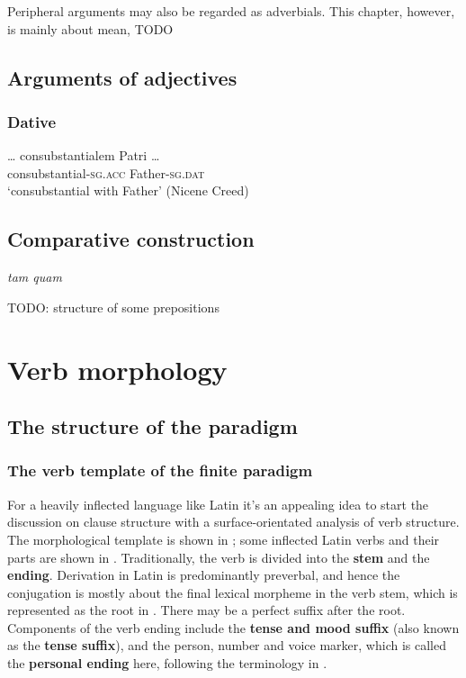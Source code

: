 \documentclass[a4paper, oneside, 12pt]{report}
\newcommand*{\citesec}[1]{\S~{#1}}
\newcommand*{\concept}[1]{\textbf{#1}}
\newcommand{\form}[1]{\emph{#1}}
\newcommand*{\category}[1]{\textsc{#1}}
\newcommand{\translate}[1]{`#1'}
\begin{document}
Peripheral arguments may also be regarded as adverbials.
This chapter, however, is mainly about mean, TODO

\section{Arguments of adjectives}

\subsection{Dative}

\begin{exe}
    \ex \gll \dots {} consubstantialem Patri \dots \\
    {} consubstantial-\category{sg.acc} Father-\category{sg.dat} \\
    \glt \translate{consubstantial with Father} (Nicene Creed)
\end{exe}

\section{Comparative construction}

\form{tam quam}

TODO: structure of some prepositions


\chapter{Verb morphology}\label{chap:verb}

\section{The structure of the paradigm}

\subsection{The verb template of the finite paradigm}\label{sec:verb.finite.paradigm}

For a heavily inflected language like Latin
it's an appealing idea 
to start the discussion on clause structure 
with a surface-orientated analysis of verb structure.
The morphological template is shown in ; 
some inflected Latin verbs and their parts are shown in .
Traditionally, the verb is divided 
into the \concept{stem} and the \concept{ending}.
Derivation in Latin is predominantly preverbal,
and hence the conjugation is mostly about the final lexical morpheme in the verb stem,
which is represented as the root in .
There may be a perfect suffix after the root.
Components of the verb ending include 
the \concept{tense and mood suffix} (also known as the \concept{tense suffix}),
and the person, number and voice marker,
which is called the \concept{personal ending} here, 
following the terminology in \citet[\citesec{165}]{allen1903allen}.
\end{document}
